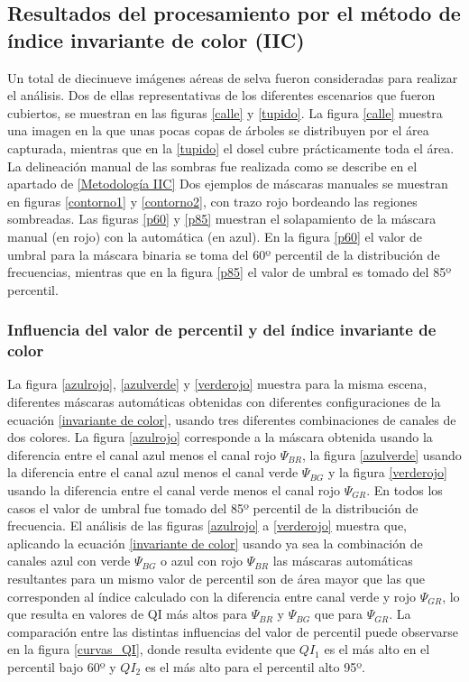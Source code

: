 \subsection{Resultados del procesamiento por el método de índice invariante de color (IIC)} \label{Resultados IIC}
Un total de diecinueve imágenes aéreas de selva fueron consideradas para realizar el análisis. Dos de ellas representativas de los diferentes escenarios que fueron cubiertos, se muestran en las figuras \ref{calle} y \ref{tupido}. La figura \ref{calle} muestra una imagen en la que unas pocas copas de árboles se distribuyen por el área capturada, mientras que en la \ref{tupido} el dosel cubre prácticamente toda el área. La delineación manual de las sombras fue realizada como se describe en el apartado de \ref{Metodología IIC}
Dos ejemplos de máscaras manuales se muestran en figuras \ref{contorno1} y \ref{contorno2}, con trazo rojo bordeando las regiones sombreadas. Las figuras \ref{p60} y \ref{p85} muestran el solapamiento de la máscara manual (en rojo) con la automática (en azul). En la figura \ref{p60} el valor de umbral para la máscara binaria se toma del 60º percentil de la distribución de frecuencias, mientras que en la figura \ref{p85} el valor de umbral es tomado del 85º percentil.



\subsubsection{Influencia del valor de percentil y del índice invariante de color}

La figura \ref{azulrojo}, \ref{azulverde} y \ref{verderojo} muestra para la misma escena, diferentes máscaras automáticas obtenidas con diferentes configuraciones de la ecuación \ref{invariante de color}, usando tres diferentes combinaciones de canales de dos colores. La figura \ref{azulrojo} corresponde a la máscara obtenida usando la diferencia entre el canal azul menos el canal rojo $\Psi_{BR}$, la figura \ref{azulverde} usando la diferencia entre el canal azul menos el canal verde $\Psi_{BG}$ y la figura \ref{verderojo} usando la diferencia entre el canal verde menos el canal rojo $\Psi_{GR}$. En todos los casos el valor de umbral fue tomado del 85º percentil de la distribución de frecuencia. El análisis de las figuras \ref{azulrojo} a \ref{verderojo} muestra que, aplicando la ecuación \ref{invariante de color} usando ya sea la combinación de canales azul con verde $\Psi_{BG}$ o azul con rojo $\Psi_{BR}$  las máscaras automáticas resultantes para un mismo valor de percentil son de área mayor que las que corresponden al índice calculado con la diferencia entre canal verde y rojo $\Psi_{GR}$, lo que resulta en valores de QI más altos para $\Psi_{BR}$ y $\Psi_{BG}$ que para $\Psi_{GR}$. La comparación entre las distintas influencias del valor de percentil puede observarse en la figura \ref{curvas_QI}, donde resulta evidente que $QI_1$ es el más alto en el percentil bajo 60º y $QI_2$ es el más alto para el percentil alto 95º. 

